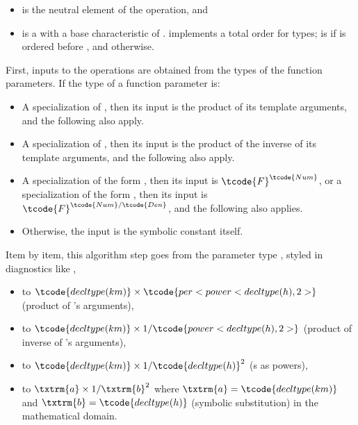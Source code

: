 \begin{itemdescr}
\pnum
\mandates
\begin{itemize}
\item
{} is the neutral element of the operation, and
\item
{} is a 
with a base characteristic of .
 implements a total order for types;
 is  if  is ordered before , and  otherwise.
\end{itemize}

\pnum
\effects
\pnum
First, inputs to the operations are obtained from the types of the function parameters.
If the type of a function parameter is:
\begin{itemize}
\item
A specialization of ,
then its input is the product of its template arguments, and
the following also apply.
\item
A specialization of ,
then its input is the product of the inverse of its template arguments, and
the following also apply.
\item
A specialization of the form ,
then its input is $\tcode{F}^\tcode{Num}$, or
a specialization of the form ,
then its input is $\tcode{F}^{\tcode{Num}/\tcode{Den}}$, and
the following also applies.
\item
Otherwise, the input is the symbolic constant itself.
\end{itemize}
\begin{example}
Item by item, this algorithm step goes from the \Cpp{} parameter type
,
styled in diagnostics like
,
\begin{itemize}
\item
to $\tcode{decltype(km)} \times \tcode{per<power<decltype(h), 2>}$ (product of 's arguments),
\item
to $\tcode{decltype(km)} \times 1/\tcode{power<decltype(h), 2>}$ (product of inverse of 's arguments),
\item
to $\tcode{decltype(km)} \times 1/\tcode{decltype(h)}^2$ (s as powers),
\item
to $\txtrm{a} \times 1/\txtrm{b}^2$ where $\txtrm{a} = \tcode{decltype(km)}$ and $\txtrm{b} = \tcode{decltype(h)}$ (symbolic substitution)
in the mathematical domain.
\end{itemize}
\end{example}


\end{itemdescr}
